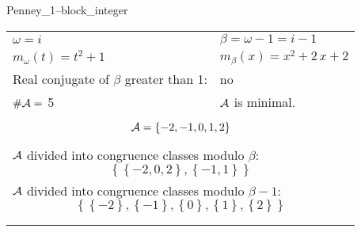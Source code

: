 \begin{exmp}
\label{ex:compareAF}

Penney\_1--block\_integer

\rule{0cm}{0cm}

\begin{tabular}{ll}
$\omega=  i $  & $\beta= \omega - 1 = i - 1 $\\
$m_\omega(t)=  t^{2} + 1 $  & $m_\beta(x)=  x^{2} + 2 \, x + 2 $\\
Real conjugate of $\beta$ greater than 1:   &  no \\
$\#\mathcal{A}= $ 5 $ $ & $\mathcal{A}$ is minimal. \\
\multicolumn{2}{l}{\begin{minipage}{\textwidth}\begin{dmath*}\A = \left\{-2, -1, 0, 1, 2\right\}  \end{dmath*}\end{minipage} }\\
\multicolumn{2}{l}{\begin{minipage}{\textwidth}$\mathcal{A}$ divided into congruence classes modulo $\beta$: \begin{dmath*} \left\{\left\{-2, 0, 2\right\}, \left\{-1, 1\right\}\right\}  \end{dmath*}\end{minipage} }\\[10pt]
\multicolumn{2}{l}{\begin{minipage}{\textwidth}$\mathcal{A}$ divided into congruence classes modulo $\beta-1$: \begin{dmath*} \left\{\left\{-2\right\}, \left\{-1\right\}, \left\{0\right\}, \left\{1\right\}, \left\{2\right\}\right\}  \end{dmath*}\end{minipage} }\\
 & \\ \hline
 & \\
\end{tabular}


\end{exmp}
